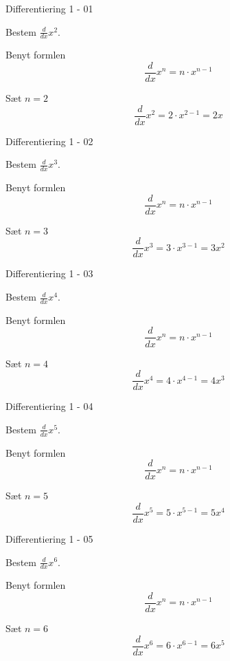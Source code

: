 \documentclass{article}
\begin{document}
\tableofcontents
\newpage

\begin{exercise}{Differentiering 1 - 01}

Bestem $\frac{d}{dx} x^2$.


\hint

Benyt formlen
\[
\frac{d}{dx} x^n = n \cdot x^{n - 1}
\]

\hint

Sæt $n = 2$
\[
\frac{d}{dx} x^2 = 2 \cdot x^{2 - 1} = 2 x
\]
\end{exercise}

\begin{exercise}{Differentiering 1 - 02}

Bestem $\frac{d}{dx} x^3$.


\hint

Benyt formlen
\[
\frac{d}{dx} x^n = n \cdot x^{n - 1}
\]

\hint

Sæt $n = 3$
\[
\frac{d}{dx} x^3 = 3 \cdot x^{3 - 1} = 3 x^2
\]
\end{exercise}

\begin{exercise}{Differentiering 1 - 03}

Bestem $\frac{d}{dx} x^4$.


\hint

Benyt formlen
\[
\frac{d}{dx} x^n = n \cdot x^{n - 1}
\]

\hint

Sæt $n = 4$
\[
\frac{d}{dx} x^4 = 4 \cdot x^{4 - 1} = 4 x^3
\]
\end{exercise}

\begin{exercise}{Differentiering 1 - 04}

Bestem $\frac{d}{dx} x^5$.


\hint

Benyt formlen
\[
\frac{d}{dx} x^n = n \cdot x^{n - 1}
\]

\hint

Sæt $n = 5$
\[
\frac{d}{dx} x^5 = 5 \cdot x^{5 - 1} = 5 x^4
\]
\end{exercise}

\begin{exercise}{Differentiering 1 - 05}

Bestem $\frac{d}{dx} x^6$.


\hint

Benyt formlen
\[
\frac{d}{dx} x^n = n \cdot x^{n - 1}
\]

\hint

Sæt $n = 6$
\[
\frac{d}{dx} x^6 = 6 \cdot x^{6 - 1} = 6 x^5
\]
\end{exercise}
\end{document}
